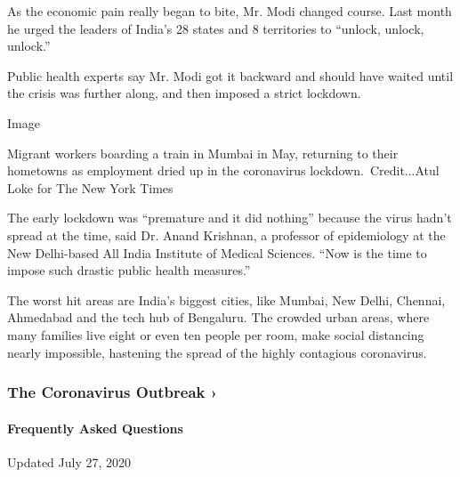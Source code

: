 As the economic pain really began to bite, Mr. Modi changed course. Last
month he urged the leaders of India's 28 states and 8 territories to
``unlock, unlock, unlock.''

Public health experts say Mr. Modi got it backward and should have
waited until the crisis was further along, and then imposed a strict
lockdown.

Image

Migrant workers boarding a train in Mumbai in May, returning to their
hometowns as employment dried up in the coronavirus
lockdown.~Credit...Atul Loke for The New York Times

The early lockdown was ``premature and it did nothing'' because the
virus hadn't spread at the time, said Dr. Anand Krishnan, a professor of
epidemiology at the New Delhi-based All India Institute of Medical
Sciences. ``Now is the time to impose such drastic public health
measures.''

The worst hit areas are India's biggest cities, like Mumbai, New Delhi,
Chennai, Ahmedabad and the tech hub of Bengaluru. The crowded urban
areas, where many families live eight or even ten people per room, make
social distancing nearly impossible, hastening the spread of the highly
contagious coronavirus.

\href{https://www.nytimes.com/news-event/coronavirus?action=click\&pgtype=Article\&state=default\&region=MAIN_CONTENT_3\&context=storylines_faq}{}

\hypertarget{the-coronavirus-outbreak-}{%
\subsubsection{The Coronavirus Outbreak
›}\label{the-coronavirus-outbreak-}}

\hypertarget{frequently-asked-questions}{%
\paragraph{Frequently Asked
Questions}\label{frequently-asked-questions}}

Updated July 27, 2020


